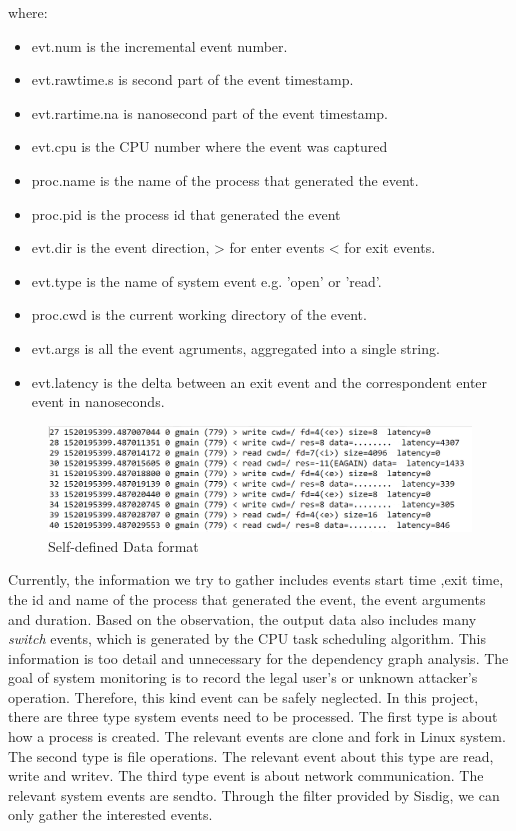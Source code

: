 where:
\begin{itemize}[noitemsep]
	\item evt.num is the incremental event number.
	\item evt.rawtime.s is second part of the event timestamp.
	\item evt.rartime.na is nanosecond part of the event timestamp.
	\item evt.cpu is the CPU number where the event was captured
	\item proc.name is the name of the process that generated the event.
	\item proc.pid is the process id that generated the event
	\item evt.dir is the event direction, > for enter events < for exit events.
	\item evt.type is the name of system event e.g. 'open' or 'read'.
	\item proc.cwd is the current working directory of the event.
	\item evt.args is all the event agruments, aggregated into a single string.
	\item evt.latency is the delta between an exit event and the correspondent enter event in nanoseconds.
\end{itemize}
\begin{figure}
	\centering
	\includegraphics[scale=0.4]{fig2}
	\caption{Self-defined Data format}
\end{figure}
Currently, the information we try to gather includes events start time ,exit time, the id and name of the process that generated the event, the event arguments and duration. Based on the observation, the output data also includes many \textit{switch} events, which is generated by the CPU task scheduling algorithm. This information is too detail and unnecessary for the dependency graph analysis. The goal of system monitoring is to record the legal user's or unknown attacker's operation. Therefore, this  kind event can be safely neglected. In this project, there are three type system events need to be processed. The first type is about how a process is created. The relevant events are clone and fork in Linux system. The second type is file operations. The relevant event about this type are read, write and writev. The third type event is about network communication. The relevant system events are sendto. Through the filter provided by Sisdig, we can only gather the interested events.
